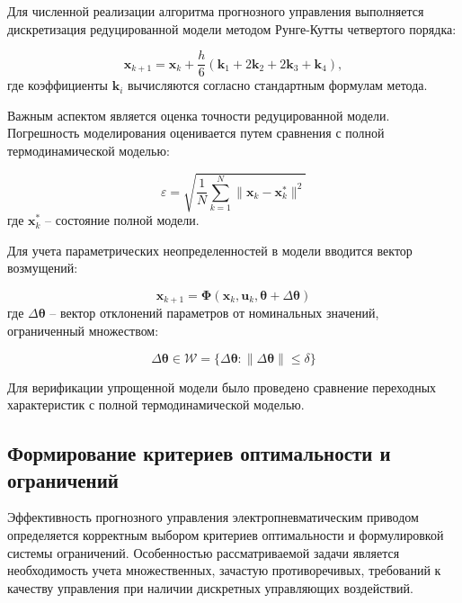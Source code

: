 Для численной реализации алгоритма прогнозного управления выполняется
дискретизация редуцированной модели методом Рунге-Кутты четвертого порядка:

\begin{equation}
	\mathbf{x}_{k+1} = \mathbf{x}_k + \frac{h}{6}(\mathbf{k}_1 + 2\mathbf{k}_2 + 2\mathbf{k}_3 + \mathbf{k}_4),
\end{equation}
где коэффициенты $\mathbf{k}_i$ вычисляются согласно стандартным формулам метода.

Важным аспектом является оценка точности редуцированной модели. Погрешность
моделирования оценивается путем сравнения с полной термодинамической моделью:

\begin{equation}
	\varepsilon = \sqrt{\frac{1}{N}\sum_{k=1}^N\|\mathbf{x}_k - \mathbf{x}_k^*\|^2}
\end{equation}
где $\mathbf{x}_k^*$ -- состояние полной модели.

Для учета параметрических неопределенностей в модели вводится вектор возмущений:

\begin{equation}
	\mathbf{x}_{k+1} = \boldsymbol{\Phi}(\mathbf{x}_k, \mathbf{u}_k, \boldsymbol{\theta} + \Delta\boldsymbol{\theta})
\end{equation}
где $\Delta\boldsymbol{\theta}$ -- вектор отклонений параметров от номинальных значений, ограниченный множеством:

\begin{equation}
	\Delta\boldsymbol{\theta} \in \mathcal{W} = \{\Delta\boldsymbol{\theta}: \|\Delta\boldsymbol{\theta}\| \leq \delta\}
\end{equation}

Для верификации упрощенной модели было проведено сравнение переходных характеристик с полной термодинамической моделью.

\subsection{Формирование критериев оптимальности и ограничений}\label{subsec:ch3/sec5/sub3}

Эффективность прогнозного управления электропневматическим приводом определяется корректным выбором
критериев оптимальности и формулировкой системы ограничений. Особенностью рассматриваемой задачи является
необходимость учета множественных, зачастую противоречивых,
требований к качеству управления при наличии дискретных управляющих воздействий.

